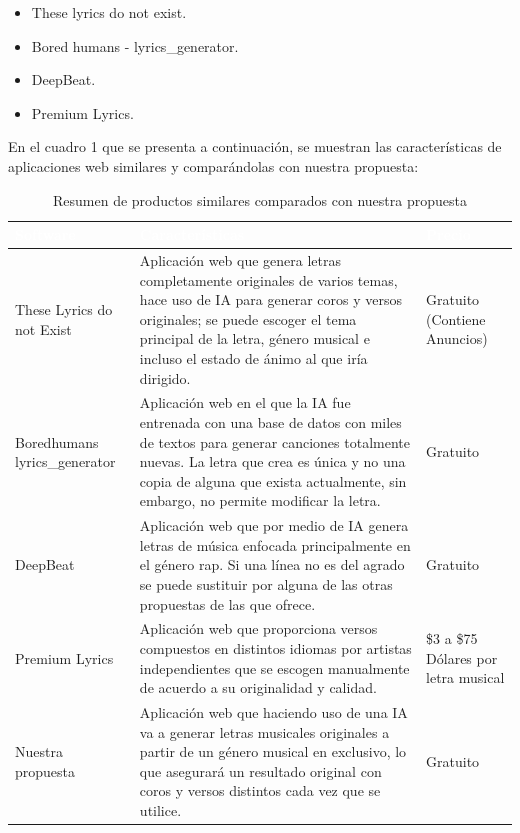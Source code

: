 \documentclass[12pt, a4paper, titlepage]{report}
\begin{document}
    \begin{itemize}
    	\item These lyrics do not exist.
    	\item Bored humans - lyrics\_generator.
    	\item DeepBeat.
    	\item Premium Lyrics.
    \end{itemize}
	\newpage
	En el cuadro 1 que se presenta a continuación, se muestran las características de aplicaciones web similares y comparándolas con nuestra propuesta:
	\begin{table}[!htbp]
		\caption[Productos similares]{Resumen de productos similares comparados con nuestra propuesta}
		\begin{tabular}{|m{3.5cm}|m{6.5cm}|m{3.5cm}|}
			\hline    			
			\rowcolor{guindapoli}
			\hfil {\textbf{\textcolor{white}{Software}}} & \hfil {\textbf{\textcolor{white}{Características}}} & \hfil {\textbf{\textcolor{white}{Precio}}} \\
			\hline
			These Lyrics do not Exist & Aplicación web que genera letras completamente originales de varios temas, hace uso de IA para generar coros y versos originales; se puede escoger el tema principal de la letra, género musical e incluso el estado de ánimo al que iría dirigido. & Gratuito (Contiene Anuncios) \\
			\hline
			Boredhumans lyrics\_generator & Aplicación web en el que la IA fue entrenada con una base de datos con miles de textos para generar canciones totalmente nuevas. La letra que crea es única y no una copia de alguna que exista actualmente, sin embargo, no permite modificar la letra. & \hfil Gratuito \\
			\hline
			\hfil DeepBeat & Aplicación web que por medio de IA genera letras de música enfocada principalmente en el género rap. Si una línea no es del agrado se puede sustituir por alguna de las otras propuestas de las que ofrece. & \hfil Gratuito \\
			\hline
			\hfil Premium Lyrics & Aplicación web que proporciona versos compuestos en distintos idiomas por artistas independientes que se escogen manualmente de acuerdo a su originalidad y calidad. & \$3 a \$75 Dólares por letra musical \\
			\hline
			\hfil Nuestra propuesta & Aplicación web que haciendo uso de una IA va a generar letras musicales originales a partir de un género musical en exclusivo, lo que asegurará un resultado original con coros y versos distintos cada vez que se utilice. & \hfil Gratuito \\
			\hline
		\end{tabular}\label{table:Propuestas}%
\end{table}
\newpage
\end{document}
